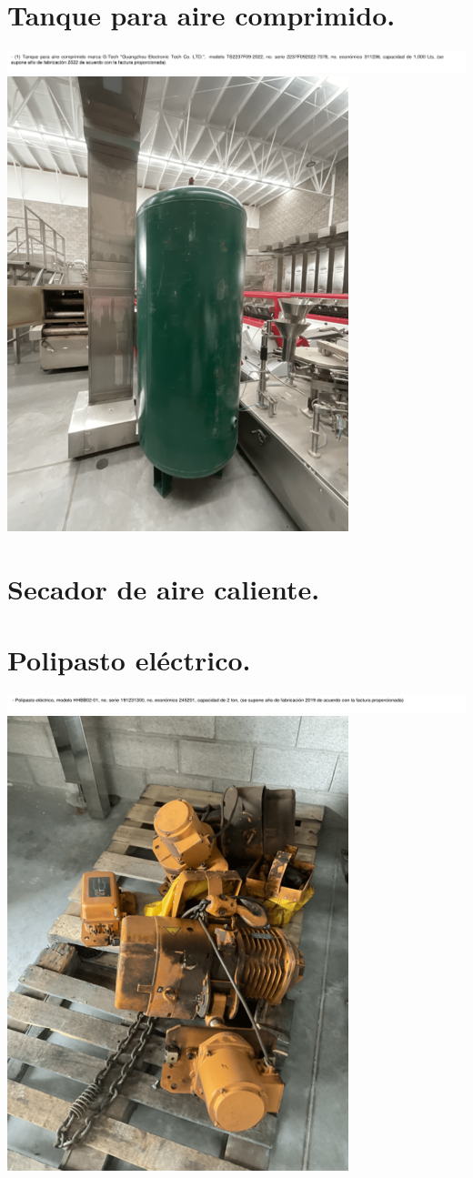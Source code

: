 \documentclass{article}
\begin{document}
\section{Tanque para aire comprimido.} %

\includegraphics[width=  \linewidth]{images/decript/1.png}
\includegraphics[width=  .5\linewidth]{images/foto/1.png}


\section{Secador de aire caliente.} %


\section{Polipasto eléctrico.} %

\includegraphics[width=  \linewidth]{images/decript/3.png}
\includegraphics[width=  .5\linewidth]{images/foto/3.png}
\end{document}
